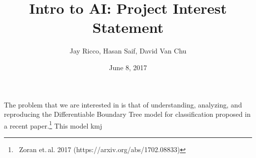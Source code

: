 \documentclass[12pt,letterpaper]{article}
\author{Jay Ricco, Hasan Saif, David Van Chu}
\title{Intro to AI: Project Interest Statement}
\date{June 8, 2017}
\begin{document}
	\maketitle

	The problem that we are interested in is that of understanding, analyzing, and reproducing the Differentiable Boundary Tree model for classification proposed in a recent paper.\footnote{\ Zoran et.\,al. 2017 (https://arxiv.org/abs/1702.08833)} This model kmj
\end{document}

